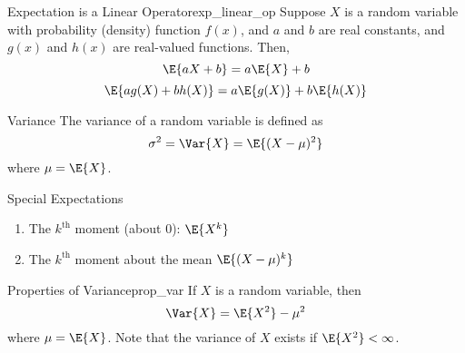 \begin{Theorem}{Expectation is a Linear Operator}{exp_linear_op}
    Suppose $ X $ is a random variable with probability (density)
    function $ f(x) $, and $ a $ and $ b $ are real constants,
    and $ g(x) $ and $ h(x) $ are real-valued functions. Then,
    \[ \E{aX+b}=a\E{X}+b \]
    \[ \E{a g(X)+b h(X)}=a\E{g(X)}+b\E{h(X)} \]
\end{Theorem}
\begin{Definition}{Variance}{}
    The variance of a random variable is defined as
    \[ \sigma^2=\Var{X}=\E{(X-\mu)^2} \]
    where $ \mu=\E{X} $.
\end{Definition}
\begin{Definition}{Special Expectations}{}
    \begin{enumerate}[label=(\Roman*)]
        \item The $ k^{\text{th}} $ moment (about 0): $ \E{X^k} $
        \item The $ k^{\text{th}} $ moment about the mean $ \E{(X-\mu)^k} $
    \end{enumerate}
\end{Definition}
\begin{Theorem}{Properties of Variance}{prop_var}
    If $ X $ is a random variable, then
    \[ \Var{X}=\E{X^2}-\mu^2 \]
    where $ \mu=\E{X} $. Note that the
    variance of $ X $ exists if $ \E{X^2}<\infty $.
\end{Theorem}
